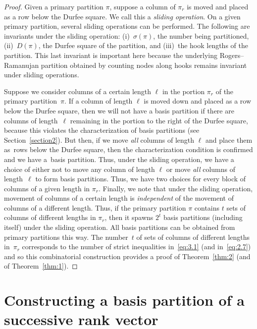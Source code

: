 \documentclass[pdftex]{sigma}
\numberwithin{equation}{section}
\theoremstyle{definition}
\begin{document}
\begin{proof} Given a primary partition $\pi$, suppose a column of
$\pi_r$ is moved and placed as a row below the Durfee square. We call
this a {\it sliding operation}. On a given primary partition, several
sliding operations can be performed. The following are invariants under
the sliding operation: (i)~$\sigma(\pi)$, the number being partitioned,
(ii)~$D(\pi)$, the Durfee square of the partition, and (iii)~the hook
lengths of the partition. This last invariant is important here
because the underlying Rogers--Ramanujan partition obtained by counting
nodes along hooks remains invariant under sliding operations.

Suppose we consider columns of a certain length $\ell$ in the portion
$\pi_r$ of the primary partition~$\pi$. If a column of length $\ell$
is moved down and placed as a row below the Durfee square, then we will
not have a basis partition if there are columns of length~$\ell$
remaining in the portion to the right of the Durfee square, because
this violates the characterization of basis partitions (see Section~\ref{section2}).
But then, if we move {\it all} columns of length $\ell$ and place them
as~rows below the Durfee square, then the characterization condition is
confirmed and we have a~basis partition. Thus, under the sliding operation,
we have a choice of either not to move any column of length $\ell$ or
move {\it all} columns of length~$\ell$ to form basis partitions. Thus, we
have two choices for every block of columns of a given length in $\pi_r$.
Finally, we note that under the sliding operation, movement of columns
of a certain length is {\it independent} of the movement of columns
of a different length. Thus, if the primary partition $\pi$ contains
$t$ sets of columns of different lengths in $\pi_r$, then it spawns
$2^t$ basis partitions (including itself) under the sliding operation.
All basis partitions can be obtained from primary partitions this way.
The number~$t$ of sets of columns of different lengths in~$\pi_r$ corresponds to the number of strict inequalities in~\eqref{eq:3.1}
(and in~\eqref{eq:2.7}) and so this combinatorial construction provides a
proof of Theorem~\ref{thm:2} (and of Theorem~\ref{thm:1}).
\end{proof}

\section{Constructing a basis partition of a successive rank vector}\label{section4}
\end{document}

